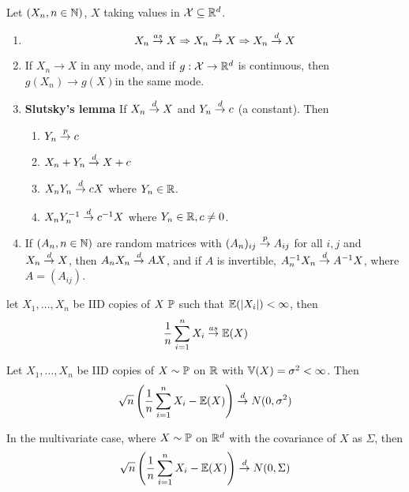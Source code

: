 \begin{proposition}
  Let $(X_{n}, n \in \mathbb{N})$, $X$ taking values in $\mathcal{X} \subseteq
  \mathbb{R}^{d}$.
  \begin{enumerate}
  \item
    \begin{equation}
      \label{eq:9}
      X_{n} \overset{as}{\rightarrow} X \Rightarrow X_{n} \overset{p}{\rightarrow} X \Rightarrow X_{n} \overset{d}{\rightarrow} X
    \end{equation}
  \item If $X_{n} \rightarrow X$ in any mode, and if $g: \mathcal{X}
    \rightarrow \mathbb{R}^{d}$ is continuous, then $g(X_{n}) \rightarrow
    g(X)$in the same mode.
  \item \textbf{Slutsky's lemma} If $X_{n} \overset{d}{\rightarrow} X$ and $Y_{n} \overset{d}{\rightarrow} c$ (a
    constant). Then
    \begin{enumerate}
    \item  $Y_{n} \overset{p}{\rightarrow} c$
    \item $X_{n} + Y_{n}\overset{d}{\rightarrow} X + c$
    \item $X_{n} Y_{n} \overset{d}{\rightarrow} cX$ where $Y_{n} \in \mathbb{R}$.
    \item $X_{n} Y_{n}^{{-1}} \overset{d}{\rightarrow} c^{-1} X$ where $Y_{n} \in \mathbb{R}, c
      \neq 0$.
    \end{enumerate}
  \item If $(A_{n}, n \in \mathbb{N})$ are random matrices with
    $(A_{n})_{{ij}} \overset{p}{\rightarrow} A_{ij}$ for all $i, j$ and $X_{n} \overset{d}{\rightarrow} X$,
    then $A_{n} X_{n} \overset{d}{\rightarrow} AX$, and if $A$ is invertible, $A_{n}^{-1}
    X_{n} \overset{d}{\rightarrow} A^{-1}X$, where $A = (A_{ij})$.
  \end{enumerate}
\end{proposition}

\begin{thm}
  \label{defn:stochastic_convergence_concepts:1}
  let $X_{1}, \dots, X_n$ be IID copies of $X ~ \Prob$ such that
  $\E{|X_{i}|} < \infty$, then
  \begin{equation}
    \label{eq:18}
    \frac{1}{n} \sum_{i=1}^{n} X_{i} \cas \E{X}
  \end{equation}
\end{thm}

\begin{thm}
  \label{defn:stochastic_convergence_concepts:2}
  Let $X_{1}, \dots, X_{n}$ be IID copies of $X \sim \Prob$ on $\mathbb{R}$
  with $\Var{X} = \sigma^{2} < \infty$. Then
  \begin{equation}
    \label{eq:19}
    \sqrt{n}\left(\frac{1}{n} \sum_{i=1}^{n} X_{i} - \E{X}\right) \cd N(0, \sigma^{2})
  \end{equation}

  In the multivariate case, where $X \sim \Prob$ on $\mathbb{R}^{d}$ with the
  covariance of $X$ as $\Sigma$, then
  \begin{equation}
    \label{eq:21}
    \sqrt{n} \left(\frac{1}{n} \sum_{i=1}^{n} X_{i} - \E{X}\right) \cd N(0, \Sigma)
  \end{equation}
\end{thm}

